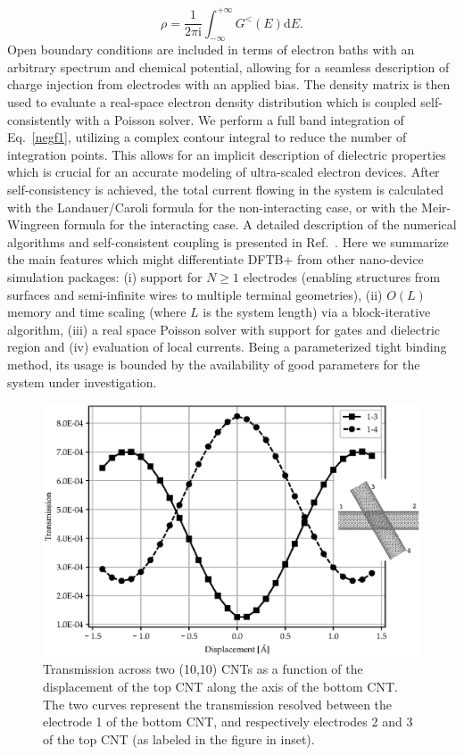 \documentclass[reprint,onecolumn,superscriptaddress]{revtex4-1}
\newcommand{\dftbp}{DFTB+}
\begin{document}
\begin{equation} \label{negf1}
  \rho = \frac{1}{2\pi \mathrm{i}} \int_{-\infty}^{+\infty} {G^{<}(E)
    \mathrm{d}E}.
\end{equation}
%
Open boundary conditions are included in terms of electron baths with an
arbitrary spectrum and chemical potential, allowing for a seamless description
of charge injection from electrodes with an applied bias. The density matrix is
then used to evaluate a real-space electron density distribution which is
coupled self-consistently with a Poisson solver.  We perform a full band
integration of Eq.~\ref{negf1}, utilizing a complex contour integral to reduce
the number of integration points.\cite{pecchia2004} This allows for an implicit
description of dielectric properties which is crucial for an accurate modeling
of ultra-scaled electron devices.\cite{markov2015,chu2018} After
self-consistency is achieved, the total current flowing in the system is
calculated with the Landauer/Caroli formula for the non-interacting case, or
with the Meir-Wingreen formula for the interacting case.\cite{haug2008} A
detailed description of the numerical algorithms and self-consistent coupling is
presented in Ref.~\cite{pecchia2008}. Here we summarize the main features
which might differentiate \dftbp{} from other nano-device simulation packages:
(i) support for $N \geqslant 1$ electrodes (enabling structures from surfaces
and semi-infinite wires to multiple terminal geometries), (ii) $O(L)$
memory and time scaling (where $L$ is the system length) via a block-iterative
algorithm, (iii) a real space Poisson solver with support for gates and
dielectric region and (iv) evaluation of local currents.  Being a parameterized
tight binding method, its usage is bounded by the availability of good
parameters for the system under investigation.

\begin{figure}[htbp]
  \centering
  \includegraphics[scale=.75]{figures/dftb-negf1.eps}
  \caption{\label{fig:dftb_negf1} Transmission across two (10,10) CNTs as a
    function of the displacement of the top CNT along the axis of the bottom
    CNT. The two curves represent the transmission resolved between the
    electrode 1 of the bottom CNT, and respectively electrodes 2 and 3 of the
    top CNT (as labeled in the figure in inset).}
\end{figure}
\end{document}
